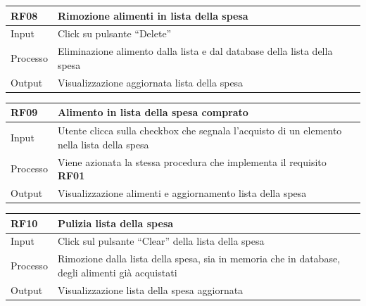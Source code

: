 \documentclass{article}
\begin{document}
\begin{table}[H]
    \begin{flushleft}
      \begin{tabular}{l|l}
        \toprule
        \textbf{RF08} & \textbf{Rimozione alimenti in lista della spesa}\\
        \midrule
        Input & Click su pulsante “Delete”\\
        Processo & Eliminazione alimento dalla lista e dal database della lista della spesa\\
        Output & Visualizzazione aggiornata lista della spesa\\
        \bottomrule
      \end{tabular}
    \end{flushleft}
\end{table}

\begin{table}[H]
    \begin{flushleft}
      \begin{tabular}{l|l}
        \toprule
        \textbf{RF09} & \textbf{Alimento in lista della spesa comprato}\\
        \midrule
        Input & Utente clicca sulla checkbox che segnala l’acquisto di un elemento nella lista della spesa\\
        Processo & Viene azionata la stessa procedura che implementa il requisito \textbf{RF01}\\
        Output & Visualizzazione alimenti e aggiornamento lista della spesa\\
        \bottomrule
      \end{tabular}
    \end{flushleft}
\end{table}

\begin{table}[H]
    \begin{flushleft}
      \begin{tabular}{l|l}
        \toprule
        \textbf{RF10} & \textbf{Pulizia lista della spesa}\\
        \midrule
        Input & Click sul pulsante “Clear” della lista della spesa\\
        Processo & Rimozione dalla lista della spesa, sia in memoria che in database, degli alimenti già acquistati\\
        Output & Visualizzazione lista della spesa aggiornata\\
        \bottomrule
      \end{tabular}
    \end{flushleft}
\end{table}
\end{document}

